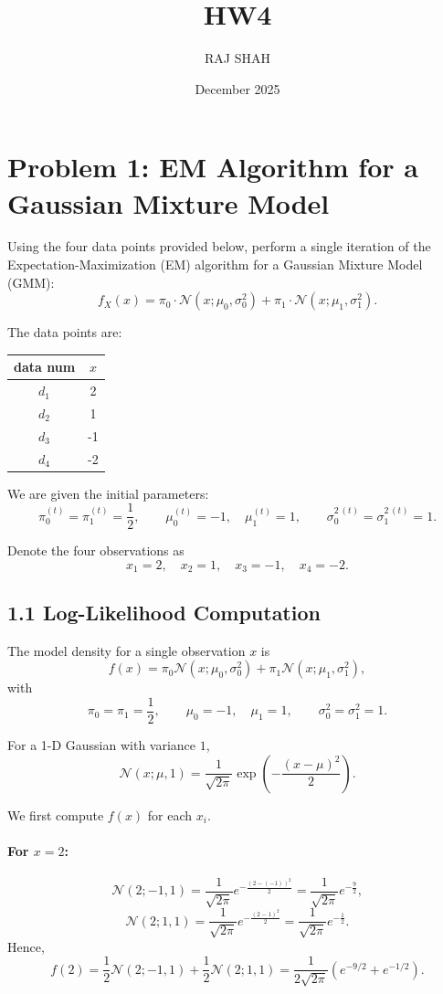 \documentclass{article}
\title{HW4}
\author{RAJ SHAH}
\date{December 2025}
\begin{document}
\maketitle

\section*{Problem 1: EM Algorithm for a Gaussian Mixture Model}

Using the four data points provided below, perform a single iteration of the Expectation-Maximization (EM) algorithm for a Gaussian Mixture Model (GMM):
\[
f_X(x) = \pi_0 \cdot \mathcal{N}(x;\mu_0, \sigma_0^2) + \pi_1 \cdot \mathcal{N}(x;\mu_1, \sigma_1^2).
\]

The data points are:
\begin{center}
\begin{tabular}{|c|c|}
\hline
data num & $x$ \\
\hline
$d_1$ & 2 \\
\hline
$d_2$ & 1 \\
\hline
$d_3$ & -1 \\
\hline
$d_4$ & -2 \\
\hline
\end{tabular}
\end{center}

We are given the initial parameters:
\[
\pi_0^{(t)} = \pi_1^{(t)} = \frac{1}{2}, \qquad
\mu_0^{(t)} = -1,\quad \mu_1^{(t)} = 1,\qquad
\sigma_0^{2\,(t)} = \sigma_1^{2\,(t)} = 1.
\]

Denote the four observations as
\[
x_1 = 2,\quad x_2 = 1,\quad x_3 = -1,\quad x_4 = -2.
\]

\subsection*{1.1 Log-Likelihood Computation}

The model density for a single observation $x$ is
\[
f(x) = \pi_0 \mathcal{N}(x;\mu_0,\sigma_0^2)
      + \pi_1 \mathcal{N}(x;\mu_1,\sigma_1^2),
\]
with
\[
\pi_0 = \pi_1 = \frac{1}{2}, \qquad
\mu_0 = -1,\quad \mu_1 = 1,\qquad
\sigma_0^2 = \sigma_1^2 = 1.
\]

For a 1-D Gaussian with variance $1$,
\[
\mathcal{N}(x;\mu,1)
= \frac{1}{\sqrt{2\pi}} \exp\!\left( -\frac{(x-\mu)^2}{2} \right).
\]

We first compute $f(x)$ for each $x_i$.

\paragraph{For $x = 2$:}
\[
\mathcal{N}(2;-1,1)
= \frac{1}{\sqrt{2\pi}} e^{-\frac{(2 - (-1))^2}{2}}
= \frac{1}{\sqrt{2\pi}} e^{-\frac{9}{2}},
\]
\[
\mathcal{N}(2;1,1)
= \frac{1}{\sqrt{2\pi}} e^{-\frac{(2 - 1)^2}{2}}
= \frac{1}{\sqrt{2\pi}} e^{-\frac{1}{2}}.
\]
Hence,
\[
f(2)
= \frac12 \mathcal{N}(2;-1,1) + \frac12 \mathcal{N}(2;1,1)
= \frac{1}{2\sqrt{2\pi}}\left( e^{-9/2} + e^{-1/2} \right).
\]
\end{document}

